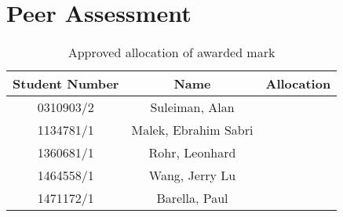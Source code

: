 \section{Peer Assessment}

\begin{table}[h]
\centering
\begin{tabular}{|c|c|l|}
	\hline
	\textbf{Student Number} & \textbf{Name} & \textbf{Allocation} \\ \hline
	0310903/2 & Suleiman, Alan & \\ \hline
	1134781/1 & Malek, Ebrahim Sabri & \\ \hline
	1360681/1 & Rohr, Leonhard & \\ \hline
	1464558/1 & Wang, Jerry Lu & \\ \hline
	1471172/1 & Barella, Paul &  \\ \hline
\end{tabular}
\caption{Approved allocation of awarded mark}
\end{table}